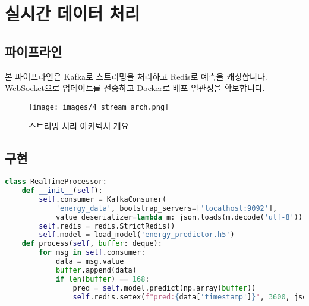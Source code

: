 \section{실시간 데이터 처리}

\subsection{파이프라인}
본 파이프라인은 Kafka로 스트리밍을 처리하고 Redis로 예측을 캐싱합니다. WebSocket으로 업데이트를 전송하고 Docker로 배포 일관성을 확보합니다.

\begin{figure}[H]
    \centering
    \texttt{[image: images/4\_stream\_arch.png]}
    \caption{스트리밍 처리 아키텍처 개요}
    \label{fig:stream_arch}
\end{figure}

\subsection{구현}
\begin{lstlisting}[language=Python]
class RealTimeProcessor:
    def __init__(self):
        self.consumer = KafkaConsumer(
            'energy_data', bootstrap_servers=['localhost:9092'],
            value_deserializer=lambda m: json.loads(m.decode('utf-8')))
        self.redis = redis.StrictRedis()
        self.model = load_model('energy_predictor.h5')
    def process(self, buffer: deque):
        for msg in self.consumer:
            data = msg.value
            buffer.append(data)
            if len(buffer) == 168:
                pred = self.model.predict(np.array(buffer))
                self.redis.setex(f"pred:{data['timestamp']}", 3600, json.dumps(pred.tolist()))
\end{lstlisting}

